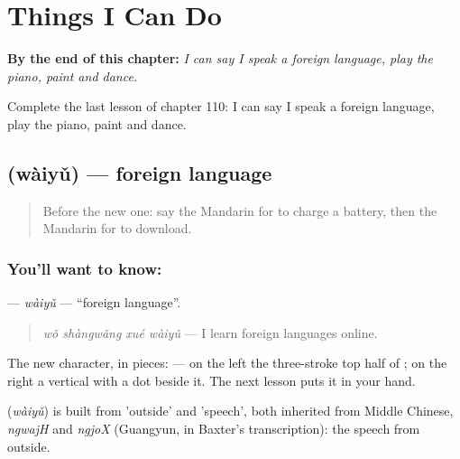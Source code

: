 
\chapter{Things I Can Do}
\label{ch:zh-things-i-can-do}

\begin{chapteropening}
\textbf{By the end of this chapter:} \emph{I can say I speak a foreign language, play the piano, paint and dance.}

Complete the last lesson of chapter 110: I can say I speak a foreign language, play the piano, paint and dance.
\end{chapteropening}

\section[\texorpdfstring{\zh{外语} (wàiyǔ)}{外语 (wàiyǔ)}]{ (wàiyǔ) — foreign language}

\label{lesson:ZH-C110-waiyu}



\begin{quote}
Before the new one: say the Mandarin for to charge a battery, then the Mandarin for to download.
\end{quote}

\subsection*{You'll want to know: }
\textbf{} — \emph{wàiyǔ} — \textquotedblleft{}foreign language\textquotedblright{}.

\begin{quote}
\textbf{} \emph{wǒ shàngwǎng xué wàiyǔ} — I learn foreign languages online.
\end{quote}

The new character, in pieces:  — on the left the three-stroke top half of ; on the right a vertical with a dot beside it. The next lesson puts it in your hand.

\begin{cousinweb}
\textbf{} (\emph{wàiyǔ}) is built from  'outside' and  'speech', both inherited from Middle Chinese, \emph{ngwajH} and \emph{ngjoX} (Guangyun, in Baxter's transcription): the speech from outside.
\end{cousinweb}

